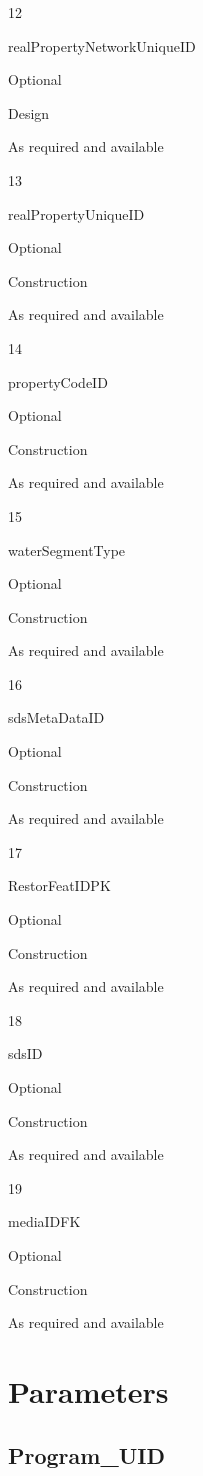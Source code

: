 \documentclass[
  letterpaper,
  DIV=11,
  numbers=noendperiod]{scrreprt}
\begin{document}
12

realPropertyNetworkUniqueID

Optional

Design

As required and available

13

realPropertyUniqueID

Optional

Construction

As required and available

14

propertyCodeID

Optional

Construction

As required and available

15

waterSegmentType

Optional

Construction

As required and available

16

sdsMetaDataID

Optional

Construction

As required and available

17

RestorFeatIDPK

Optional

Construction

As required and available

18

sdsID

Optional

Construction

As required and available

19

mediaIDFK

Optional

Construction

As required and available

\section{Parameters}\label{parameters-26}

\subsection{Program\_UID}\label{program_uid-26}
\end{document}
